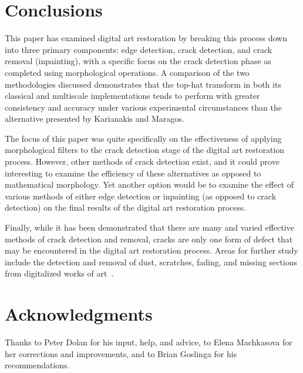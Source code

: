 \documentclass{sig-alternate}
\begin{document}
\section{Conclusions}\label{conclusion}
This paper has examined digital art restoration by breaking this process down into three primary components: edge detection, crack detection, and crack removal (inpainting), with a specific focus on the crack detection phase as completed using morphological operations. A comparison of the two methodologies discussed demonstrates that the top-hat transform in both its classical and multiscale implementations tends to perform with greater consistency and accuracy under various experimental circumstances than the alternative presented by Karianakis and Maragos.

The focus of this paper was quite specifically on the effectiveness of applying morphological filters to the crack detection stage of the digital art restoration process. However, other methods of crack detection exist, and it could prove interesting to examine the efficiency of these alternatives as opposed to mathematical morphology. Yet another option would be to examine the effect of various methods of either edge detection or inpainting (as opposed to crack detection) on the final results of the digital art restoration process.

Finally, while it has been demonstrated that there are many and varied effective methods of crack detection and removal, cracks are only one form of defect that may be encountered in the digital art restoration process. Areas for further study include the detection and removal of dust, scratches, fading, and missing sections from digitalized works of art~\cite{TopHat:2010}.

\section{Acknowledgments}
Thanks to Peter Dolan for his input, help, and advice, to Elena Machkasova for her corrections and improvements, and to Brian Goslinga for his recommendations.



\end{document}

